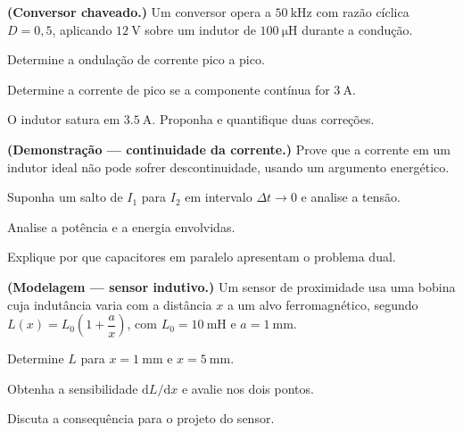 \begin{questao}[4]{}

\textbf{(Conversor chaveado.)} Um conversor opera a $\SI{50}{\kilo\hertz}$ com
razão cíclica $D=0{,}5$, aplicando $\SI{12}{\volt}$ sobre um indutor de
$\SI{100}{\micro\henry}$ durante a condução.
\begin{itensq}
\item Determine a ondulação de corrente pico a pico.
\item Determine a corrente de pico se a componente contínua for
      $\SI{3}{\ampere}$.
\item O indutor satura em $\SI{3.5}{\ampere}$. Proponha e quantifique duas
      correções.
\end{itensq}


\end{questao}
\begin{questao}[4]{}

\textbf{(Demonstração --- continuidade da corrente.)} Prove que a corrente em
um indutor ideal não pode sofrer descontinuidade, usando um argumento
energético.
\begin{itensq}
\item Suponha um salto de $I_1$ para $I_2$ em intervalo $\Delta t\to0$ e
      analise a tensão.
\item Analise a potência e a energia envolvidas.
\item Explique por que capacitores em paralelo apresentam o problema dual.
\end{itensq}


\end{questao}
\begin{questao}[4]{}

\textbf{(Modelagem --- sensor indutivo.)} Um sensor de proximidade usa uma
bobina cuja indutância varia com a distância $x$ a um alvo ferromagnético,
segundo $L(x)=L_0\left(1+\dfrac{a}{x}\right)$, com
$L_0=\SI{10}{\milli\henry}$ e $a=\SI{1}{\milli\meter}$.
\begin{itensq}
\item Determine $L$ para $x=\SI{1}{\milli\meter}$ e $x=\SI{5}{\milli\meter}$.
\item Obtenha a sensibilidade $\mathrm{d}L/\mathrm{d}x$ e avalie nos dois
      pontos.
\item Discuta a consequência para o projeto do sensor.
\end{itensq}


\end{questao}

